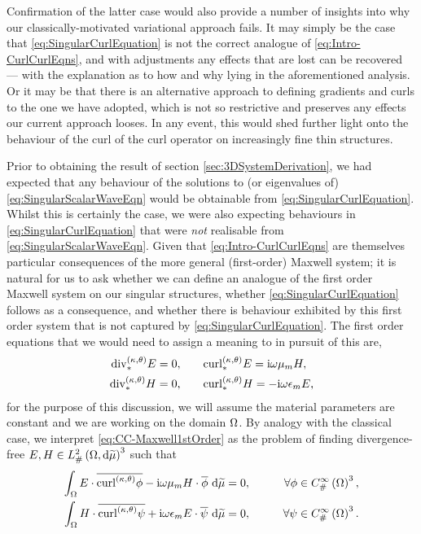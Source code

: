 Confirmation of the latter case would also provide a number of insights into why our classically-motivated variational approach fails.
It may simply be the case that \eqref{eq:SingularCurlEquation} is not the correct analogue of \eqref{eq:Intro-CurlCurlEqns}, and with adjustments any effects that are lost can be recovered --- with the explanation as to how and why lying in the aforementioned analysis.
Or it may be that there is an alternative approach to defining gradients and curls to the one we have adopted, which is not so restrictive and preserves any effects our current approach looses.
In any event, this would shed further light onto the behaviour of the curl of the curl operator on increasingly fine thin structures.

Prior to obtaining the result of section \ref{sec:3DSystemDerivation}, we had expected that any behaviour of the solutions to (or eigenvalues of) \eqref{eq:SingularScalarWaveEqn} would be obtainable from \eqref{eq:SingularCurlEquation}.
Whilst this is certainly the case, we were also expecting behaviours in \eqref{eq:SingularCurlEquation} that were \emph{not} realisable from \eqref{eq:SingularScalarWaveEqn}.
Given that \eqref{eq:Intro-CurlCurlEqns} are themselves particular consequences of the more general (first-order) Maxwell system; it is natural for us to ask whether we can define an analogue of the first order Maxwell system on our singular structures, whether \eqref{eq:SingularCurlEquation} follows as a consequence, and whether there is behaviour exhibited by this first order system that is not captured by \eqref{eq:SingularCurlEquation}.
The first order equations that we would need to assign a meaning to in pursuit of this are,
\begin{subequations} \label{eq:CC-Maxwell1stOrder}
	\begin{align}
		\mathrm{div}_{*}^{\left( \kappa, \theta \right)} E = 0,
		&\qquad
		\mathrm{curl}_{*}^{\left( \kappa, \theta \right)}E = \mathrm{i}\omega\mu_m H, \\
		\mathrm{div}_{*}^{\left( \kappa, \theta \right)} H = 0,
		&\qquad
		\mathrm{curl}_{*}^{\left( \kappa, \theta \right)}H = -\mathrm{i}\omega\epsilon_m E,
	\end{align}
\end{subequations}
for the purpose of this discussion, we will assume the material parameters are constant and we are working on the domain $\Omega$.
By analogy with the classical case, we interpret \eqref{eq:CC-Maxwell1stOrder} as the problem of finding divergence-free $E,H\in L^2_{\#}\left( \Omega,\mathrm{d} \widetilde{\mu} \right)^3$ such that
\begin{subequations} \label{eq:CC-Maxwell1stOrderVariational}
	\begin{align} 
		\int_{\Omega} E\cdot\overline{\mathrm{curl}_{}^{\left( \kappa, \theta \right)}\phi} - \mathrm{i}\omega\mu_m H\cdot\overline{\phi}  \ \mathrm{d}\widetilde{\mu} &= 0, 
		\qquad &\forall \phi\in C^{\infty}_{\#}\left( \Omega \right)^3, \\
		\int_{\Omega} H\cdot\overline{\mathrm{curl}_{}^{\left( \kappa, \theta \right)}\psi} + \mathrm{i}\omega\epsilon_m E\cdot\overline{\psi}  \ \mathrm{d}\widetilde{\mu} &= 0,
		\qquad &\forall \psi\in C^{\infty}_{\#}\left( \Omega \right)^3.
	\end{align}
\end{subequations}
